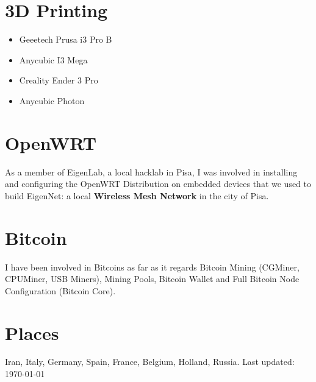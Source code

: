 \documentclass[]{friggeri-cv}
\begin{document}
\begin{aside}\vspace{-2.8cm}
\section{3D Printing \textcolor{red}{\faConnectdevelop}}
\begin{itemize}
	\item Geeetech Prusa i3 Pro B
	\item Anycubic I3 Mega
	\item Creality Ender 3 Pro
	\item Anycubic Photon
\end{itemize}\vspace{6mm}
\section{OpenWRT \textcolor{green}{\faWifi}}
As a member of EigenLab, a local hacklab in Pisa, I was involved in installing and configuring the OpenWRT Distribution on embedded devices that we used to build EigenNet: a local \textbf{Wireless Mesh Network} in the city of Pisa.\vspace{6mm}
\section{Bitcoin \textcolor{red}{\faBitcoin}}
I have been involved in Bitcoins as far as it regards Bitcoin Mining (CGMiner, CPUMiner, USB Miners), Mining Pools, Bitcoin Wallet and Full Bitcoin Node Configuration (Bitcoin Core).\vspace{6mm}
\section{Places \textcolor{light-blue}{\faMapMarker}}
Iran, Italy, Germany, Spain, France, Belgium, Holland, Russia.\vspace{6mm}
\small{Last updated: \today\ }
\end{aside}

\end{document}
